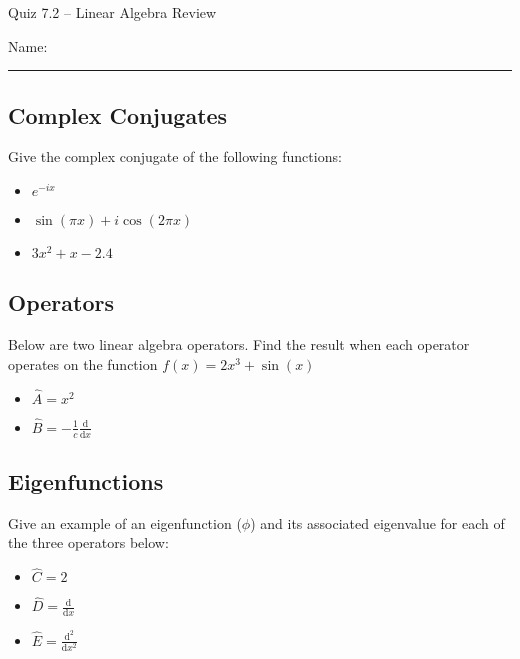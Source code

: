\documentclass[11pt, letterpaper]{memoir}
\begin{document}
	\begin{center}
		{\large Quiz 7.2 --	Linear Algebra Review}
	\end{center}
	{\large Name: \rule[-1mm]{4in}{.1pt} 

\subsection*{Complex Conjugates}
Give the complex conjugate of the following functions:
\begin{itemize}
	\item $e^{-ix}$
	
	\vspace{1em}
	\item $\sin(\pi x) + i \cos(2 \pi x)$
	
	\vspace{1em}
	\item $3x^2 + x - 2.4$
\end{itemize}

\vspace{1em}
\subsection*{Operators}
Below are two linear algebra operators. Find the result when each operator operates on the function $f(x) = 2x^3 + \sin(x)$
\begin{itemize}
	\item $\hat{A} = x^2$
	
	\vspace{1em}
	\item $\hat{B} = -\frac{1}{c}\frac{\mathrm{d}}{\mathrm{d}x}$
\end{itemize}

\vspace{1em}
\subsection*{Eigenfunctions}
Give an example of an eigenfunction ($\phi$) and its associated eigenvalue for each of the three operators below:

\begin{itemize}
	\item $\hat{C} = 2$
	
	\vspace{3em}
	\item $\hat{D} = \frac{\mathrm{d}}{\mathrm{d}x}$
	
	\vspace{3em}
	\item $\hat{E} = \frac{\mathrm{d}^2}{\mathrm{d}x^2}$
\end{itemize}

}
\end{document}
